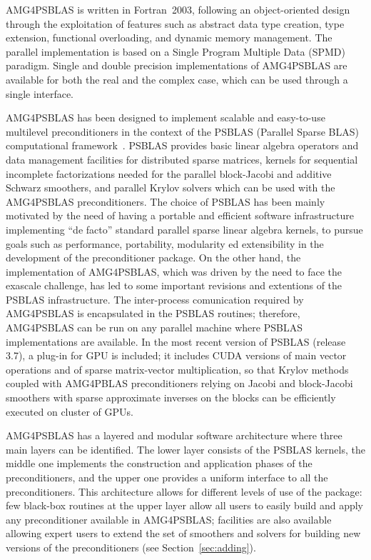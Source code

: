 AMG4PSBLAS is written in Fortran~2003, following an
object-oriented design through the exploitation of features
such as abstract data type creation, type extension, functional overloading, and
dynamic memory management.
The parallel implementation is based on a Single Program Multiple Data
(SPMD) paradigm.  Single and
double precision implementations of AMG4PSBLAS are available for both the
real and the complex case, which can be used through a single
interface.

AMG4PSBLAS has been designed to implement scalable and easy-to-use
multilevel preconditioners in the context of the PSBLAS (Parallel Sparse BLAS)
computational framework~\cite{psblas_00,PSBLAS3}. PSBLAS provides basic linear algebra
operators and data management facilities for distributed sparse matrices,
kernels for sequential incomplete factorizations needed for the
parallel block-Jacobi and additive Schwarz smoothers, and 
parallel Krylov solvers which can be used with the AMG4PSBLAS preconditioners.
The choice of PSBLAS has been mainly motivated by the need of having
a portable and efficient software infrastructure implementing ``de facto'' standard
parallel sparse linear algebra kernels, to pursue goals such as performance,
portability, modularity ed extensibility in the development of the preconditioner
package. On the other hand, the implementation of AMG4PSBLAS, which
was driven by the need to face the exascale challenge, has led to some
important  revisions and extentions of the PSBLAS infrastructure. 
The inter-process comunication required by AMG4PSBLAS is encapsulated
in the PSBLAS routines;
therefore, AMG4PSBLAS can be run on any parallel machine where PSBLAS 
implementations are available. In the most recent version of PSBLAS
(release 3.7), a plug-in for GPU is included; it includes CUDA
versions of main vector operations and of sparse matrix-vector
multiplication, so that Krylov methods coupled with AMG4PBLAS
preconditioners    relying on Jacobi and block-Jacobi smoothers with
sparse approximate inverses on the blocks can be efficiently executed
on cluster of GPUs. 

AMG4PSBLAS has a layered and modular software architecture where three main layers can be
identified.  The lower layer consists of the PSBLAS kernels, the middle one implements
the construction and application phases of the preconditioners, and the upper one
provides a uniform interface to all the preconditioners.
This architecture allows for different levels of use of the package:
few black-box routines at the upper layer allow all users to easily
build and apply any preconditioner available in AMG4PSBLAS;
facilities are also available allowing expert users to extend the set of smoothers
and solvers for building new versions of the preconditioners (see
Section~\ref{sec:adding}).

